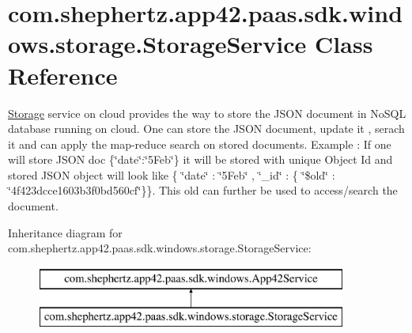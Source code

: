 \hypertarget{classcom_1_1shephertz_1_1app42_1_1paas_1_1sdk_1_1windows_1_1storage_1_1_storage_service}{\section{com.\+shephertz.\+app42.\+paas.\+sdk.\+windows.\+storage.\+Storage\+Service Class Reference}
\label{classcom_1_1shephertz_1_1app42_1_1paas_1_1sdk_1_1windows_1_1storage_1_1_storage_service}
}


\hyperlink{classcom_1_1shephertz_1_1app42_1_1paas_1_1sdk_1_1windows_1_1storage_1_1_storage}{Storage} service on cloud provides the way to store the J\+S\+O\+N document in No\+S\+Q\+L database running on cloud. One can store the J\+S\+O\+N document, update it , serach it and can apply the map-\/reduce search on stored documents. Example \+: If one will store J\+S\+O\+N doc \{\char`\"{}date\char`\"{}\+:\char`\"{}5\+Feb\char`\"{}\} it will be stored with unique Object Id and stored J\+S\+O\+N object will look like \{ \char`\"{}date\char`\"{} \+: \char`\"{}5\+Feb\char`\"{} , \char`\"{}\+\_\+id\char`\"{} \+: \{ \char`\"{}\$old\char`\"{} \+: \char`\"{}4f423dcce1603b3f0bd560cf\char`\"{}\}\}. This old can further be used to access/search the document.  


Inheritance diagram for com.\+shephertz.\+app42.\+paas.\+sdk.\+windows.\+storage.\+Storage\+Service\+:\begin{figure}[H]
\begin{center}
\leavevmode
\includegraphics[height=2.000000cm]{classcom_1_1shephertz_1_1app42_1_1paas_1_1sdk_1_1windows_1_1storage_1_1_storage_service}
\end{center}
\end{figure}
